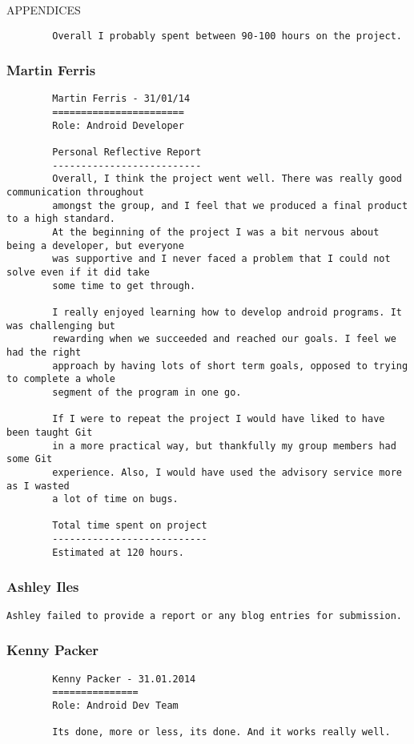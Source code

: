 \documentclass{article}
\begin{document}
\begin{section}{APPENDICES}
\begin{verbatim}
		Overall I probably spent between 90-100 hours on the project.
		\end{verbatim}
		
		\clearpage
		\subsubsection{Martin Ferris}
		\begin{verbatim}
		Martin Ferris - 31/01/14 
		=======================
		Role: Android Developer

		Personal Reflective Report
		--------------------------
		Overall, I think the project went well. There was really good communication throughout
		amongst the group, and I feel that we produced a final product to a high standard.
		At the beginning of the project I was a bit nervous about being a developer, but everyone
		was supportive and I never faced a problem that I could not solve even if it did take 
		some time to get through.

		I really enjoyed learning how to develop android programs. It was challenging but 
		rewarding when we succeeded and reached our goals. I feel we had the right 
		approach by having lots of short term goals, opposed to trying to complete a whole 
		segment of the program in one go.

		If I were to repeat the project I would have liked to have been taught Git 
		in a more practical way, but thankfully my group members had some Git 
		experience. Also, I would have used the advisory service more as I wasted 
		a lot of time on bugs.

		Total time spent on project
		---------------------------
		Estimated at 120 hours.
		\end{verbatim}
		
		\clearpage
		\subsubsection{Ashley Iles}
		{\tt Ashley failed to provide a report or any blog entries for submission.}
		
		\clearpage
		\subsubsection{Kenny Packer}
		\begin{verbatim}
		Kenny Packer - 31.01.2014
		===============
		Role: Android Dev Team

		Its done, more or less, its done. And it works really well.


\end{verbatim}
\end{section}
\end{document}
